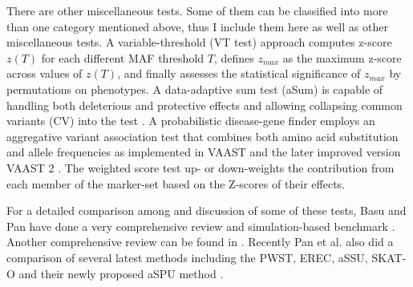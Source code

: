 \documentclass[12pt]{article}
\begin{document}
There are other miscellaneous tests. Some of them can be classified into more than one category mentioned above, thus I include them here as well as other miscellaneous tests. A variable-threshold (VT test) approach \cite{Price2010} computes z-score $z(T)$ for each different MAF threshold $T$, defines $z_{max}$ as the maximum z-score across values of $z(T)$, and finally assesses the statistical significance of $z_{max}$ by permutations on phenotypes. A data-adaptive sum test (aSum) is capable of handling both deleterious and protective effects and allowing collapsing common variants (CV) into the test \cite{Han2010}. A probabilistic disease-gene finder employs an aggregative variant association test that combines both amino acid substitution and allele frequencies as implemented in VAAST \cite{Yandell2011} and the later improved version VAAST 2 \cite{Hu2013}. The weighted score test \cite{Cai2012} up- or down-weights the contribution from each member of the marker-set based on the Z-scores of their effects.

For a detailed comparison among and discussion of some of these tests, Basu and Pan have done a very comprehensive review and simulation-based benchmark \cite{Basu2011}. Another comprehensive review can be found in \cite{Bansal2010}. Recently Pan et al. also did a comparison of several latest methods including the PWST, EREC, aSSU, SKAT-O and their newly proposed aSPU method \cite{pan2014powerful}.
\end{document}
